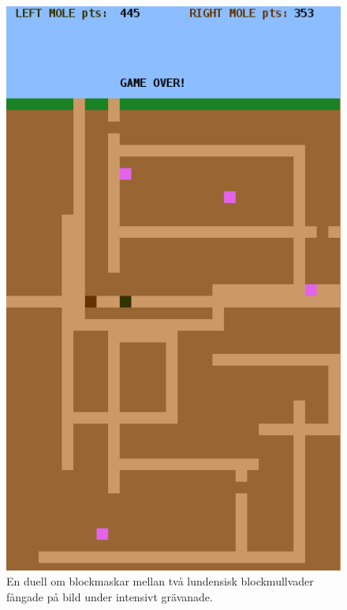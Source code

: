 {\raggedright%
\begin{minipage}{0.45\textwidth}
\begin{figure}[H]
  \includegraphics[width=1.0\textwidth]{../img/blockbattle.png}
  \caption{En duell om blockmaskar mellan två lundensisk blockmullvader fångade på bild under intensivt grävanade.}
  \label{lab:blockbattle:fig:game}
\end{figure}
\end{minipage}%
}%
\newlength{\currentparskip}%
\newlength{\currentparindent}%
